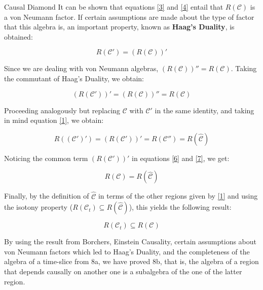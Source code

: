 \documentclass[12pt]{article}
\begin{document}
\begin{section}{Causal Diamond}
It can be shown \cite{haag_postulates_1962} that equations \ref{3} and \ref{4} entail that $R(\mathcal{C})$ is a von Neumann factor. If certain assumptions are made about the type of factor that this algebra is, an important property, known as \textbf{Haag's Duality}, is obtained:

\begin{equation}\label{5}
R(\mathcal{C}')=(R(\mathcal{C}))'
\end{equation}

Since we are dealing with von Neumann algebras, $(R(\mathcal{C}))''=R(\mathcal{C})$. Taking the commutant of Haag's Duality, we obtain:

\begin{equation}\label{6}
(R(\mathcal{C}'))'=(R(\mathcal{C}))''=R(\mathcal{C})
\end{equation}

Proceeding analogously but replacing $\mathcal{C}$ with $\mathcal{C}'$ in the same identity, and taking in mind equation \ref{1}, we obtain:

\begin{equation}\label{7}
R((\mathcal{C}')')=(R(\mathcal{C}'))'=R(\mathcal{C}'')=R(\hat{\mathcal{C}})
\end{equation}

Noticing the common term $(R(\mathcal{C}'))'$ in equations \ref{6} and \ref{7}, we get:

\begin{equation}\label{8}
R(\mathcal{C})=R(\hat{\mathcal{C}})
\end{equation}

Finally, by the definition of $\hat{\mathcal{C}}$ in terms of the other regions given by \ref{1} and using the isotony property ($R(\mathcal{C}_t) \subseteq R(\hat{\mathcal{C}})$), this yields the following result:

\begin{equation}\label{9}
R(\mathcal{C}_t) \subseteq R(\mathcal{C})
\end{equation}

By using the result from Borchers, Einstein Causality, certain assumptions about von Neumann factors which led to Haag's Duality, and the completeness of the algebra of a time-slice from 8a, we have proved 8b, that is, the algebra of a region that depends causally on another one is a subalgebra of the one of the latter region.

\end{section}
\end{document}
